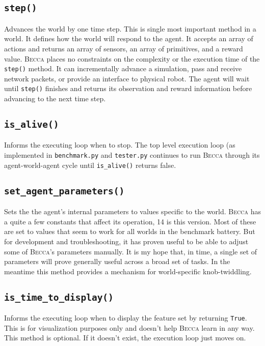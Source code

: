 \subsection{\texttt{step()}}
Advances the world by one time step. This is single most important method in a world. It defines how the world will respond to the agent. It accepts an array of actions and returns an array of sensors, an array of primitives, and a reward value. \textsc{Becca} places no constraints on the complexity or the execution time of the \texttt{step()} method. It can incrementally advance a simulation, pass and receive network packets, or provide an interface to physical robot. The agent will wait until \texttt{step()} finishes and returns its observation and reward information before advancing to the next time step.

\subsection{\texttt{is\_alive()}}
Informs the executing loop when to stop. The top level execution loop (as implemented in \texttt{benchmark.py} and \texttt{tester.py} continues to run \textsc{Becca} through its agent-world-agent cycle until \texttt{is\_alive()} returns false.

\subsection{\texttt{set\_agent\_parameters()}}
Sets the the agent's internal parameters to values specific to the world. \textsc{Becca} has a quite a few constants that affect its operation, 14 is this version. Most of these are set to values that seem to work for all worlds in the benchmark battery. But for development and troubleshooting, it has proven useful to be able to adjust some of \textsc{Becca}'s parameters manually. It is my hope that, in time, a single set of parameters will prove generally useful across a broad set of tasks. In the meantime this method provides a mechanism for world-specific knob-twiddling.

\subsection{\texttt{is\_time\_to\_display()}}
Informs the executing loop when to display the feature set by returning \texttt{True}. This is for visualization purposes only and doesn't help \textsc{Becca} learn in any way. This method is optional. If it doesn't exist, the execution loop just moves on.

